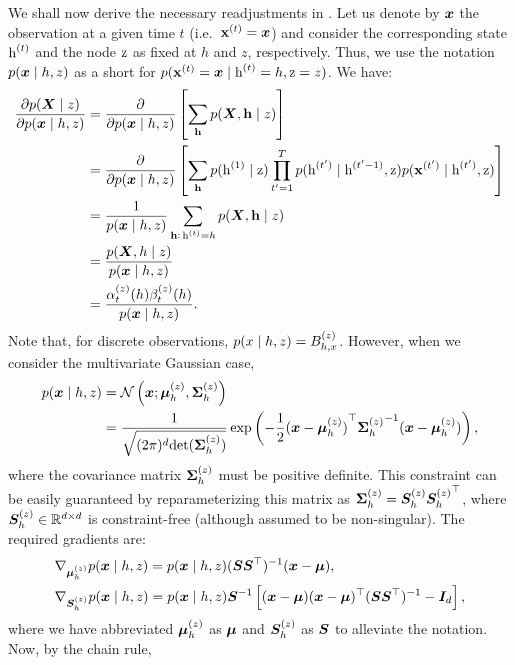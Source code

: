 We shall now derive the necessary readjustments in . Let us denote by ${\bm{x}}$ the observation at a given time $t$ (i.e.\ ${\mathbf{x}}^{(t)}={\bm{x}}$) and consider the corresponding state ${\textnormal{h}}^{(t)}$ and the node ${\textnormal{z}}$ as fixed at $h$ and $z$, respectively. Thus, we use the notation $p({\bm{x}} \mid h, z)$ as a short for $p({\mathbf{x}}^{(t)}={\bm{x}} \mid {\textnormal{h}}^{(t)}=h, {\textnormal{z}}=z)$. We have:
\begin{align}
    \frac{\partial p({\bm{X}} \mid z)}{\partial p({\bm{x}} \mid h, z)} &= \frac{\partial}{\partial p({\bm{x}} \mid h, z)} \left[\sum_{{\mathbf{h}}} p({\bm{X}}, {\mathbf{h}} \mid z)  \right] \nonumber\\
    &= \frac{\partial}{\partial p({\bm{x}} \mid h, z)} \left[\sum_{{\mathbf{h}}} p({\textnormal{h}}^{(1)} \mid {\textnormal{z}}) \prod_{t'=1}^T p({\textnormal{h}}^{(t')} \mid {\textnormal{h}}^{(t'-1)},{\textnormal{z}}) p({\mathbf{x}}^{(t')} \mid {\textnormal{h}}^{(t')},{\textnormal{z}})\right] \nonumber\\
    &= \frac{1}{p({\bm{x}} \mid h, z)} \sum_{{\mathbf{h}}:\, {\textnormal{h}}^{(t)}=h} p({\bm{X}}, {\mathbf{h}} \mid z) \nonumber\\
    &= \frac{p({\bm{X}}, h \mid z)}{p({\bm{x}} \mid h, z)} \nonumber\\
    &= \frac{\alpha_{t}^{(z)}(h) \beta_{t}^{(z)}(h)}{p({\bm{x}} \mid h, z)}.
\end{align}
Note that, for discrete observations, $p(x \mid h, z) = {B}^{(z)}_{h,x}$. However, when we consider the multivariate Gaussian case,
\begin{align}
    p({\bm{x}} \mid h, z) &= \mathcal{N}\left({\bm{x}}; {\bm{\mu}}^{(z)}_h, {\bm{\Sigma}}^{(z)}_h\right) \nonumber\\
    &= \frac{1}{\sqrt{(2\pi)^d \mathrm{det}({\bm{\Sigma}}^{(z)}_h)}} \exp \left(-\frac{1}{2} {({\bm{x}} - {\bm{\mu}}^{(z)}_h)}^\top {{\bm{\Sigma}}^{(z)}_h}^{-1} ({\bm{x}} - {\bm{\mu}}^{(z)}_h)\right),
\end{align}
where the covariance matrix ${\bm{\Sigma}}^{(z)}_h$ must be positive definite. This constraint can be easily guaranteed by reparameterizing this matrix as ${\bm{\Sigma}}^{(z)}_h = {\bm{S}}^{(z)}_h {{\bm{S}}^{(z)}_h}^\top$, where ${\bm{S}}^{(z)}_h \in {\mathbb{R}}^{d \times d}$ is constraint-free (although assumed to be non-singular). The required gradients are:
\begin{align}
    &\nabla_{{\bm{\mu}}^{(z)}_h} p({\bm{x}} \mid h, z) = p({\bm{x}} \mid h, z) ({\bm{S}} {\bm{S}}^\top)^{-1} ({\bm{x}} - {\bm{\mu}}), \\
    &\nabla_{{\bm{S}}^{(z)}_h} p({\bm{x}} \mid h, z) = p({\bm{x}} \mid h, z) {\bm{S}}^{-1} \left[ ({\bm{x}} - {\bm{\mu}}) ({\bm{x}} - {\bm{\mu}})^\top ({\bm{S}} {\bm{S}} ^\top)^{-1} - {\bm{I}}_d\right],
\end{align}
where we have abbreviated ${\bm{\mu}}^{(z)}_h$ as ${\bm{\mu}}$ and ${\bm{S}}^{(z)}_h$ as ${\bm{S}}$ to alleviate the notation. Now, by the chain rule,
